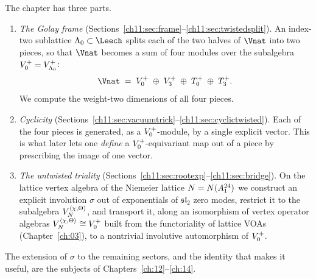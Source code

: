 The chapter has three parts.
\begin{enumerate}[label=(\Roman*)]
  \item \emph{The Golay frame} (Sections~\ref{ch11:sec:frame}--\ref{ch11:sec:twistedsplit}).
  An index-two sublattice $\chelLz\subset\Leech$ splits each of the two halves of $\Vnat$ into two
  pieces, so that $\Vnat$ becomes a sum of four modules over the subalgebra $V_0^{+}=V_{\Lambda_0}^+$:
  \begin{equation*}
    \Vnat \;=\; \chelVz\;\oplus\;\chelVt\;\oplus\;T_0^+\;\oplus\;T_3^+ .
  \end{equation*}
  We compute the weight-two dimensions of all four pieces.
  \item \emph{Cyclicity} (Sections~\ref{ch11:sec:vacuumtrick}--\ref{ch11:sec:cyclictwisted}).
  Each of the four pieces is generated, as a $V_0^{+}$-module, by a single explicit vector.  This
  is what later lets one \emph{define} a $V_0^{+}$-equivariant map out of a piece by prescribing the
  image of one vector.
  \item \emph{The untwisted triality} (Sections~\ref{ch11:sec:rootexp}--\ref{ch11:sec:bridge}).
  On the lattice vertex algebra of the Niemeier lattice $N=N(A_1^{24})$ we construct an
  explicit involution $\sigma$ out of exponentials of $\mathfrak{sl}_2$ zero modes, restrict it to
  the subalgebra $V_N^{\langle\chi,\Theta\rangle}$, and transport it, along an isomorphism of
  vertex operator algebras $V_N^{\langle\chi,\Theta\rangle}\cong V_0^{+}$ built from the
  functoriality of lattice VOAs (Chapter~\ref{ch:03}), to a nontrivial involutive automorphism
   of $V_0^{+}$.
\end{enumerate}
The extension of $\sigma$ to the remaining sectors, and the identity that makes it useful, are the
subjects of Chapters~\ref{ch:12}--\ref{ch:14}.

